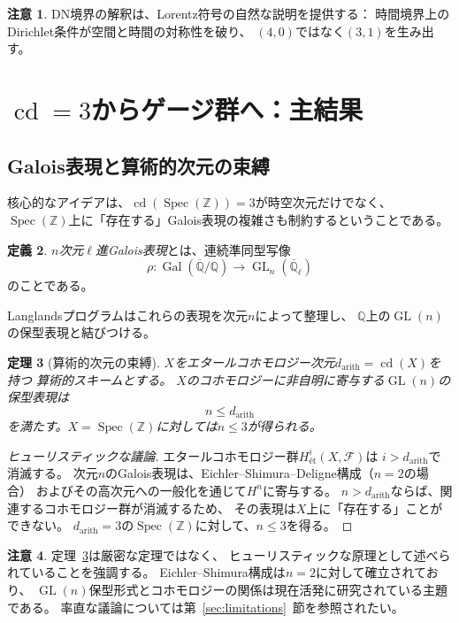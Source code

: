 \documentclass[12pt,a4paper]{article}
\newtheorem{theorem}{定理}[section]
\theoremstyle{definition}
\newtheorem{definition}[theorem]{定義}
\newtheorem{remark}[theorem]{注意}
\newcommand{\Spec}{\operatorname{Spec}}
\newcommand{\GL}{\operatorname{GL}}
\newcommand{\cd}{\operatorname{cd}}
\newcommand{\Gal}{\operatorname{Gal}}
\newcommand{\Q}{\mathbb{Q}}
\newcommand{\Z}{\mathbb{Z}}
\begin{document}
\begin{remark}
DN境界の解釈は、Lorentz符号の自然な説明を提供する：
時間境界上のDirichlet条件が空間と時間の対称性を破り、
$(4,0)$ではなく$(3,1)$を生み出す。
\end{remark}

\section{$\cd = 3$からゲージ群へ：主結果}\label{sec:gauge}

\subsection{Galois表現と算術的次元の束縛}

核心的なアイデアは、$\cd(\Spec(\Z))=3$が時空次元だけでなく、
$\Spec(\Z)$上に「存在する」Galois表現の複雑さも制約するということである。

\begin{definition}
\emph{$n$次元$\ell$進Galois表現}とは、連続準同型写像
\[
  \rho\colon \Gal(\overline{\Q}/\Q) \to \GL_n(\overline{\Q}_\ell)
\]
のことである。
\end{definition}

Langlandsプログラムはこれらの表現を次元$n$によって整理し、
$\Q$上の$\GL(n)$の保型表現と結びつける。

\begin{theorem}[算術的次元の束縛]\label{thm:gauge_bound}
$X$をエタールコホモロジー次元$d_{\mathrm{arith}} = \cd(X)$を持つ
算術的スキームとする。
$X$のコホモロジーに非自明に寄与する$\GL(n)$の保型表現は
\[
  n \le d_{\mathrm{arith}}
\]
を満たす。$X = \Spec(\Z)$に対しては$n \le 3$が得られる。
\end{theorem}

\begin{proof}[ヒューリスティックな議論]
エタールコホモロジー群$H^i_{\text{\'et}}(X,\mathscr{F})$は
$i > d_{\mathrm{arith}}$で消滅する。
次元$n$のGalois表現は、Eichler--Shimura--Deligne構成（$n=2$の場合）
およびその高次元への一般化を通じて$H^n$に寄与する。
$n > d_{\mathrm{arith}}$ならば、関連するコホモロジー群が消滅するため、
その表現は$X$上に「存在する」ことができない。
$d_{\mathrm{arith}}=3$の$\Spec(\Z)$に対して、$n \le 3$を得る。
\end{proof}

\begin{remark}
定理~\ref{thm:gauge_bound}は厳密な定理ではなく、
ヒューリスティックな原理として述べられていることを強調する。
Eichler--Shimura構成は$n=2$に対して確立されており、
$\GL(n)$保型形式とコホモロジーの関係は現在活発に研究されている主題である。
率直な議論については第~\ref{sec:limitations}~節を参照されたい。
\end{remark}
\end{document}
